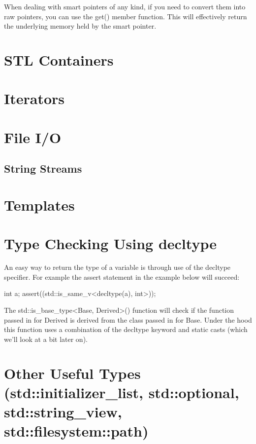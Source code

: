 \documentclass{article}
\begin{document}
When dealing with smart pointers of any kind, if you need to convert them into raw pointers, you can use the
get() member function. This will effectively return the underlying memory held by the smart pointer.

\section{STL Containers}

\section{Iterators}

\section{File I/O}

\subsection{String Streams}

\section{Templates}

\section{Type Checking Using decltype}

An easy way to return the type of a variable is through use of the decltype specifier. For example the assert
statement in the example below will succeed:

\begin{cpplst}
int a;
assert((std::is_same_v<decltype(a), int>));
\end{cpplst}

The std::is\_base\_type<Base, Derived>() function will check if the function passed in for Derived is derived
from the class passed in for Base. Under the hood this function uses a combination of the decltype keyword
and static casts (which we'll look at a bit later on).

\section{Other Useful Types (std::initializer\_list, std::optional, std::string\_view, std::filesystem::path)}
\end{document}
